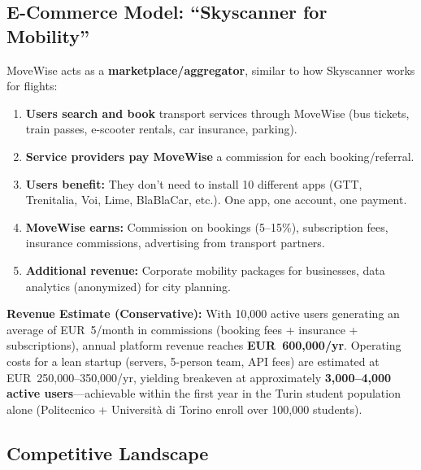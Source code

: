 \documentclass[11pt,a4paper]{article}
\begin{document}
\subsection{E-Commerce Model: ``Skyscanner for Mobility''}

\begin{tcolorbox}[colback=lightyellow,colframe=deeporange,title=\textbf{Revenue Model: How MoveWise Makes Money}]
MoveWise acts as a \textbf{marketplace/aggregator}, similar to how Skyscanner works for flights:
\begin{enumerate}[noitemsep]
    \item \textbf{Users search and book} transport services through MoveWise (bus tickets, train passes, e-scooter rentals, car insurance, parking).
    \item \textbf{Service providers pay MoveWise} a commission for each booking/referral.
    \item \textbf{Users benefit:} They don't need to install 10 different apps (GTT, Trenitalia, Voi, Lime, BlaBlaCar, etc.). One app, one account, one payment.
    \item \textbf{MoveWise earns:} Commission on bookings (5--15\%), subscription fees, insurance commissions, advertising from transport partners.
    \item \textbf{Additional revenue:} Corporate mobility packages for businesses, data analytics (anonymized) for city planning.
\end{enumerate}

\vspace{4pt}
\textbf{Revenue Estimate (Conservative):} With 10,000 active users generating an average of EUR~5/month in commissions (booking fees + insurance + subscriptions), annual platform revenue reaches \textbf{EUR~600,000/yr}. Operating costs for a lean startup (servers, 5-person team, API fees) are estimated at EUR~250,000--350,000/yr, yielding breakeven at approximately \textbf{3,000--4,000 active users}---achievable within the first year in the Turin student population alone (Politecnico + Universit\`a di Torino enroll over 100,000 students).
\end{tcolorbox}

\subsection{Competitive Landscape}
\end{document}
